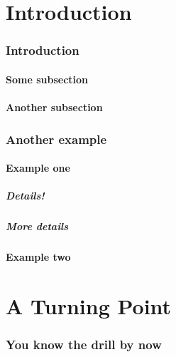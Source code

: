 \documentclass[12pt,a4paper]{csum}
\author{Awesome Student}
\begin{document}
\maketitle

\printtoc%

\part{Introduction}

    \section{Introduction}
    \lipsum[]
        \subsection{Some subsection}
        \lipsum[]
        \subsection{Another subsection}
        \lipsum[]
    \section{Another example}
    \lipsum[]
        \subsection{Example one}
        \lipsum[]
            \subsubsection{Details!}
            \lipsum[]
            \subsubsection{More details}
            \lipsum[]
        \subsection{Example two}
        \lipsum[]
\part{A Turning Point}
\lipsum[]
\section{You know the drill by now}
    \lipsum[]
\end{document}
